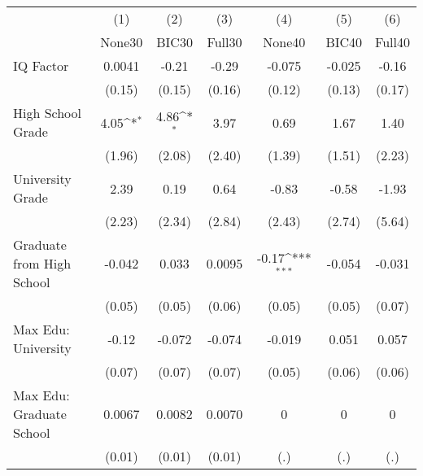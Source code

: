 {
\def\sym#1{\ifmmode^{#1}\else\(^{#1}\)\fi}
\begin{tabular}{l*{6}{c}}
\toprule
            &\multicolumn{1}{c}{(1)}&\multicolumn{1}{c}{(2)}&\multicolumn{1}{c}{(3)}&\multicolumn{1}{c}{(4)}&\multicolumn{1}{c}{(5)}&\multicolumn{1}{c}{(6)}\\
            &\multicolumn{1}{c}{None30}&\multicolumn{1}{c}{BIC30}&\multicolumn{1}{c}{Full30}&\multicolumn{1}{c}{None40}&\multicolumn{1}{c}{BIC40}&\multicolumn{1}{c}{Full40}\\
\midrule
IQ Factor   &      0.0041         &       -0.21         &       -0.29         &      -0.075         &      -0.025         &       -0.16         \\
            &      (0.15)         &      (0.15)         &      (0.16)         &      (0.12)         &      (0.13)         &      (0.17)         \\
\addlinespace
High School Grade&        4.05\sym{*}  &        4.86\sym{*}  &        3.97         &        0.69         &        1.67         &        1.40         \\
            &      (1.96)         &      (2.08)         &      (2.40)         &      (1.39)         &      (1.51)         &      (2.23)         \\
\addlinespace
University Grade&        2.39         &        0.19         &        0.64         &       -0.83         &       -0.58         &       -1.93         \\
            &      (2.23)         &      (2.34)         &      (2.84)         &      (2.43)         &      (2.74)         &      (5.64)         \\
\addlinespace
Graduate from High School&      -0.042         &       0.033         &      0.0095         &       -0.17\sym{***}&      -0.054         &      -0.031         \\
            &      (0.05)         &      (0.05)         &      (0.06)         &      (0.05)         &      (0.05)         &      (0.07)         \\
\addlinespace
Max Edu: University&       -0.12         &      -0.072         &      -0.074         &      -0.019         &       0.051         &       0.057         \\
            &      (0.07)         &      (0.07)         &      (0.07)         &      (0.05)         &      (0.06)         &      (0.06)         \\
\addlinespace
Max Edu: Graduate School&      0.0067         &      0.0082         &      0.0070         &           0         &           0         &           0         \\
            &      (0.01)         &      (0.01)         &      (0.01)         &         (.)         &         (.)         &         (.)         \\
\bottomrule
\end{tabular}
}

